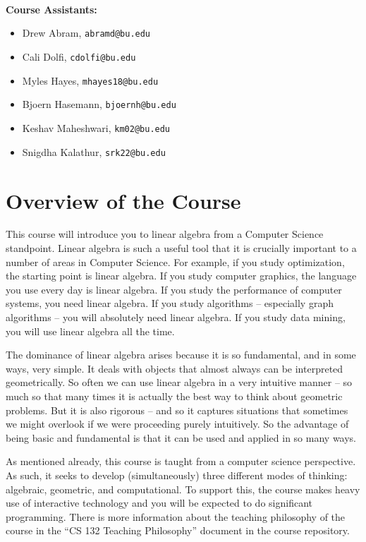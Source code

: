 \documentclass[11pt]{article}
\begin{document}
~\\~\\~\\
\textbf{Course Assistants:}  
\begin{itemize}
\item Drew Abram, \texttt{abramd@bu.edu}
\item Cali Dolfi, \texttt{cdolfi@bu.edu}
\item Myles Hayes, \texttt{mhayes18@bu.edu}
\item Bjoern Hasemann, \texttt{bjoernh@bu.edu}
\item Keshav Maheshwari, \texttt{km02@bu.edu}
\item Snigdha Kalathur, \texttt{srk22@bu.edu}
\end{itemize}

\newpage
\section*{Overview of the Course}

This course will introduce you to linear algebra from a Computer Science
standpoint.  Linear algebra is such a useful tool that it is crucially
important to a number of areas in Computer Science. For example, if you study
optimization, the starting point is linear algebra. If you study
computer graphics, the language you use every day is linear algebra. If
you study the performance of computer systems, you need linear
algebra. If you study algorithms -- especially graph algorithms -- you
will absolutely need linear algebra. If you study data mining, you will
use linear algebra all the time. 

The dominance of linear algebra arises because it is so fundamental, and
in some ways, very simple. It deals with objects that almost always can
be interpreted geometrically. So often we can use linear algebra in a
very intuitive manner -- so much so that many times it is actually the
best way to think about geometric problems. But it is also rigorous --
and so it
captures situations that sometimes we might overlook if we were
proceeding purely intuitively.  So the
advantage of being basic and fundamental is that it can be used and
applied in so many ways. 

As mentioned already, this course is taught from a computer science
perspective.  As such, it 
seeks to develop (simultaneously) three different modes of thinking:
algebraic, geometric, and computational.    To support this, the course
makes heavy use of interactive technology and you will be expected to do
significant programming.    There is more information about the teaching
philosophy of the course in the ``CS 132 Teaching Philosophy'' document
in the course repository.
\end{document}
